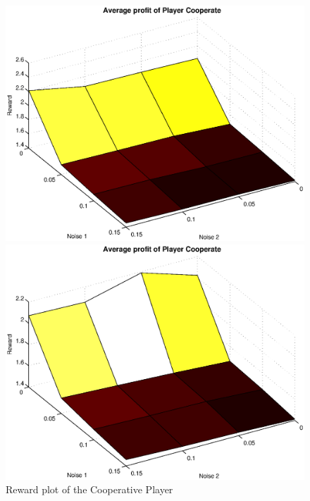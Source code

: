 \begin{figure}[h]

\begin{minipage}[hbt]{0.65\textwidth}
	\centering
	\includegraphics[width=\textwidth]{pics/simulation1/Reward_vs_Noise_of_Player_Cooperate}
\end{minipage}
\hfill
\begin{minipage}[hbt]{0.3\textwidth}
	\centering
	\includegraphics[width=\textwidth]{pics/simulation2/Reward_vs_Noise_of_Player_Cooperate}
\end{minipage}
	\caption{Reward plot of the Cooperative Player}
	\label{Pic Cooperative Player}
\end{figure}

